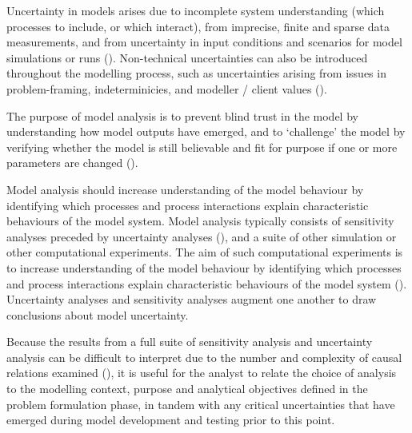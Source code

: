 \documentclass[
]{article}
\begin{document}
\begin{tcolorbox}[enhanced jigsaw, opacitybacktitle=0.6, bottomrule=.15mm, leftrule=.75mm, rightrule=.15mm, colbacktitle=quarto-callout-note-color!10!white, toprule=.15mm, titlerule=0mm, left=2mm, colframe=quarto-callout-note-color-frame, breakable, title=\textcolor{quarto-callout-note-color}{\faInfo}\hspace{0.5em}{Rationale \& Explanation}, opacityback=0, coltitle=black, bottomtitle=1mm, colback=white, toptitle=1mm, arc=.35mm]

Uncertainty in models arises due to incomplete system understanding
(which processes to include, or which interact), from imprecise, finite
and sparse data measurements, and from uncertainty in input conditions
and scenarios for model simulations or runs
(). Non-technical
uncertainties can also be introduced throughout the modelling process,
such as uncertainties arising from issues in problem-framing,
indeterminicies, and modeller / client values
().

The purpose of model analysis is to prevent blind trust in the model by
understanding how model outputs have emerged, and to `challenge' the
model by verifying whether the model is still believable and fit for
purpose if one or more parameters are changed
().

Model analysis should increase understanding of the model behaviour by
identifying which processes and process interactions explain
characteristic behaviours of the model system. Model analysis typically
consists of sensitivity analyses preceded by uncertainty analyses
(), and a suite of
other simulation or other computational experiments. The aim of such
computational experiments is to increase understanding of the model
behaviour by identifying which processes and process interactions
explain characteristic behaviours of the model system
(). Uncertainty analyses
and sensitivity analyses augment one another to draw conclusions about
model uncertainty.

Because the results from a full suite of sensitivity analysis and
uncertainty analysis can be difficult to interpret due to the number and
complexity of causal relations examined
(), it is useful for
the analyst to relate the choice of analysis to the modelling context,
purpose and analytical objectives defined in the problem formulation
phase, in tandem with any critical uncertainties that have emerged
during model development and testing prior to this point.

\end{tcolorbox}
\end{document}
